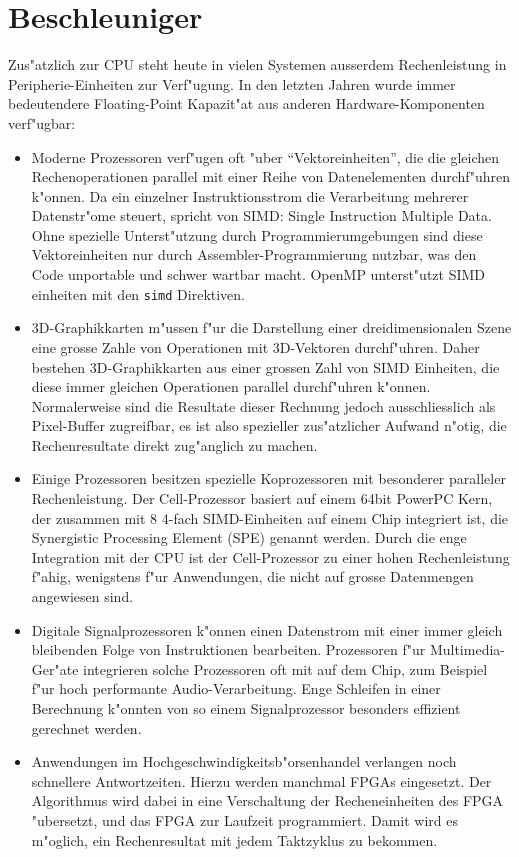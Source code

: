 \section{Beschleuniger\label{section-beschleuniger}}
Zus"atzlich zur CPU steht heute in vielen Systemen ausserdem Rechenleistung
in Peripherie-Einheiten zur Verf"ugung.
In den letzten Jahren wurde immer bedeutendere Floating-Point Kapazit"at 
aus anderen Hardware-Komponenten verf"ugbar:
\begin{itemize}
\item Moderne Prozessoren verf"ugen oft "uber ``Vektoreinheiten'', 
die die gleichen Rechenoperationen parallel mit einer Reihe von Datenelementen
durchf"uhren k"onnen.
Da ein einzelner Instruktionsstrom die Verarbeitung mehrerer Datenstr"ome
steuert, spricht von SIMD: Single Instruction Multiple Data.
Ohne spezielle Unterst"utzung durch Programmierumgebungen sind diese
Vektoreinheiten nur durch Assembler-Programmierung nutzbar, was den
Code unportable und schwer wartbar macht.
OpenMP unterst"utzt SIMD einheiten mit den {\tt simd} Direktiven.
\item 3D-Graphikkarten m"ussen f"ur die Darstellung einer dreidimensionalen
Szene eine grosse Zahle von Operationen mit 3D-Vektoren durchf"uhren. 
Daher bestehen 3D-Graphikkarten aus einer grossen Zahl von SIMD Einheiten,
die diese immer gleichen Operationen parallel durchf"uhren k"onnen. 
Normalerweise sind die Resultate dieser Rechnung jedoch ausschliesslich
als Pixel-Buffer zugreifbar, es ist also spezieller zus"atzlicher Aufwand
n"otig, die Rechenresultate direkt zug"anglich zu machen.
\item Einige Prozessoren besitzen spezielle Koprozessoren mit besonderer
paralleler Rechenleistung. Der Cell-Prozessor basiert auf einem 64bit PowerPC
Kern, der zusammen mit 8 4-fach SIMD-Einheiten auf einem Chip integriert ist, 
die Synergistic Processing Element (SPE) genannt werden.
Durch die enge Integration mit der CPU ist der Cell-Prozessor zu einer hohen
Rechenleistung f"ahig, wenigstens f"ur Anwendungen, die nicht auf grosse
Datenmengen angewiesen sind.
\item Digitale Signalprozessoren k"onnen einen Datenstrom mit einer immer
gleich bleibenden Folge von Instruktionen bearbeiten. Prozessoren
f"ur Multimedia-Ger"ate integrieren solche Prozessoren oft mit auf dem
Chip, zum Beispiel f"ur hoch performante Audio-Verarbeitung. 
Enge Schleifen in einer Berechnung k"onnten von so einem Signalprozessor 
besonders effizient gerechnet werden.
\item Anwendungen im Hochgeschwindigkeitsb"orsenhandel verlangen noch
schnellere Antwortzeiten.
Hierzu werden manchmal FPGAs eingesetzt. Der Algorithmus wird dabei
in eine Verschaltung der Recheneinheiten des FPGA "ubersetzt, und das
FPGA zur Laufzeit programmiert.
Damit wird es m"oglich, ein Rechenresultat mit jedem Taktzyklus 
zu bekommen.
\end{itemize}


